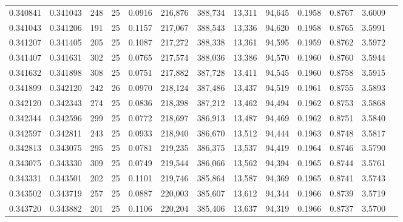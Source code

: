\begin{tabular}{rrrrrrrrrrrrr}
0.340841 & 0.341043 &   248 &  25 &                                     0.0916 & 216,876 & 388,734 &  13,311 &  94,645 & 0.1958 & 0.8767 & 3.6009 \\
0.341043 & 0.341206 &   191 &  25 &                                     0.1157 & 217,067 & 388,543 &  13,336 &  94,620 & 0.1958 & 0.8765 & 3.5991 \\
0.341207 & 0.341405 &   205 &  25 &                                     0.1087 & 217,272 & 388,338 &  13,361 &  94,595 & 0.1959 & 0.8762 & 3.5972 \\
0.341407 & 0.341631 &   302 &  25 &                                     0.0765 & 217,574 & 388,036 &  13,386 &  94,570 & 0.1960 & 0.8760 & 3.5944 \\
0.341632 & 0.341898 &   308 &  25 &                                     0.0751 & 217,882 & 387,728 &  13,411 &  94,545 & 0.1960 & 0.8758 & 3.5915 \\
0.341899 & 0.342120 &   242 &  26 &                                     0.0970 & 218,124 & 387,486 &  13,437 &  94,519 & 0.1961 & 0.8755 & 3.5893 \\
0.342120 & 0.342343 &   274 &  25 &                                     0.0836 & 218,398 & 387,212 &  13,462 &  94,494 & 0.1962 & 0.8753 & 3.5868 \\
0.342344 & 0.342596 &   299 &  25 &                                     0.0772 & 218,697 & 386,913 &  13,487 &  94,469 & 0.1962 & 0.8751 & 3.5840 \\
0.342597 & 0.342811 &   243 &  25 &                                     0.0933 & 218,940 & 386,670 &  13,512 &  94,444 & 0.1963 & 0.8748 & 3.5817 \\
0.342813 & 0.343075 &   295 &  25 &                                     0.0781 & 219,235 & 386,375 &  13,537 &  94,419 & 0.1964 & 0.8746 & 3.5790 \\
0.343075 & 0.343330 &   309 &  25 &                                     0.0749 & 219,544 & 386,066 &  13,562 &  94,394 & 0.1965 & 0.8744 & 3.5761 \\
0.343331 & 0.343501 &   202 &  25 &                                     0.1101 & 219,746 & 385,864 &  13,587 &  94,369 & 0.1965 & 0.8741 & 3.5743 \\
0.343502 & 0.343719 &   257 &  25 &                                     0.0887 & 220,003 & 385,607 &  13,612 &  94,344 & 0.1966 & 0.8739 & 3.5719 \\
0.343720 & 0.343882 &   201 &  25 &                                     0.1106 & 220,204 & 385,406 &  13,637 &  94,319 & 0.1966 & 0.8737 & 3.5700 \\

\end{tabular}

